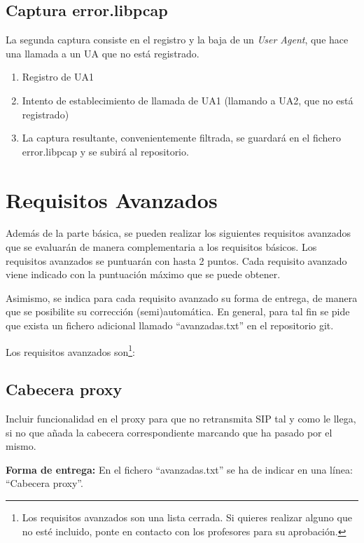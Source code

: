 \documentclass[a4paper,11pt]{article}
\begin{document}
\subsection{Captura error.libpcap}

La segunda captura consiste en el registro y la baja de un \emph{User Agent}, que hace una llamada a un UA que no está registrado.

\begin{enumerate}
  \item Registro de UA1
  \item Intento de establecimiento de llamada de UA1 (llamando a UA2, que no está registrado)
  \item La captura resultante, convenientemente filtrada, se guardará en el fichero error.libpcap
y se subirá al repositorio.
\end{enumerate}

\newpage
\section{Requisitos Avanzados}

Además de la parte básica, se pueden realizar los siguientes
requisitos avanzados que se evaluarán de manera complementaria a los requisitos básicos.
Los requisitos avanzados se puntuarán con hasta 2 puntos. Cada requisito avanzado viene indicado con la puntuación máximo que se puede obtener.

Asimismo, se indica para cada requisito avanzado su forma de entrega, de manera que se posibilite su corrección (semi)automática. En general, para tal fin se pide que exista un fichero adicional llamado ``avanzadas.txt'' en el repositorio git.


Los requisitos avanzados son\footnote{Los requisitos avanzados son una lista cerrada. Si quieres realizar alguno que no esté incluido, ponte en contacto con los profesores para su aprobación.}:

\subsection*{Cabecera proxy}

Incluir funcionalidad en el proxy para que no retransmita SIP tal y como le llega, si no que añada la cabecera correspondiente marcando que ha pasado por el mismo.

  {\bf Forma de entrega:} En el fichero ``avanzadas.txt'' se ha de indicar en una línea: ``Cabecera proxy''.
\end{document}
